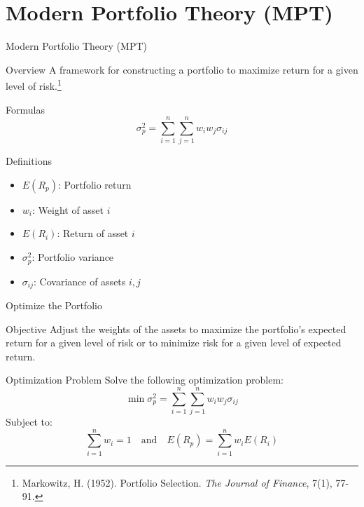 \documentclass{beamer}
\begin{document}
\section{Modern Portfolio Theory (MPT)}
\begin{frame}{Modern Portfolio Theory (MPT)}
    \begin{block}{Overview}
        A framework for constructing a portfolio to maximize return for a given level of risk.\footnote{Markowitz, H. (1952). Portfolio Selection. \textit{The Journal of Finance}, 7(1), 77-91.}
    \end{block}
    \begin{block}{Formulas}
        \begin{equation*}
            \sigma_p^2 = \sum_{i=1}^{n} \sum_{j=1}^{n} w_i w_j \sigma_{ij}
        \end{equation*}
    \end{block}
    \begin{block}{Definitions}
        \begin{multicols}{2}
            \begin{itemize}
                \item \(E(R_p)\): Portfolio return
                \item \(w_i\): Weight of asset \(i\)
                \item \(E(R_i)\): Return of asset \(i\)
                \item \(\sigma_p^2\): Portfolio variance
                \item \(\sigma_{ij}\): Covariance of assets \(i, j\)
            \end{itemize}
        \end{multicols}
    \end{block}
\end{frame}

\begin{frame}{Optimize the Portfolio}
    \begin{block}{Objective}
        Adjust the weights of the assets to maximize the portfolio's expected return for a given level of risk or to minimize risk for a given level of expected return.
    \end{block}
    \begin{block}{Optimization Problem}
        Solve the following optimization problem:
        \begin{equation*}
            \min \sigma_p^2 = \sum_{i=1}^{n} \sum_{j=1}^{n} w_i w_j \sigma_{ij}
        \end{equation*}
        Subject to:
        \begin{equation*}
            \sum_{i=1}^{n} w_i = 1 \quad \text{and} \quad E(R_p) = \sum_{i=1}^{n} w_i E(R_i)
        \end{equation*}
    \end{block}
\end{frame}
\end{document}
